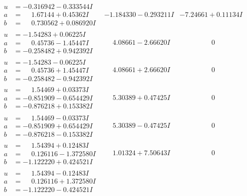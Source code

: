 \documentclass[1p]{elsarticle_modified}
\theoremstyle{definition}
\begin{document}
$$\begin{array}{c|c|c}
\begin{aligned}
u &= -0.316942 - 0.333544 I \\
a &= \phantom{-}1.67144 + 0.45362 I \\
b &= \phantom{-}0.730562 + 0.086920 I\end{aligned}
 & -1.184330 - 0.293211 I & -7.24661 + 0.11134 I \\ \hline\begin{aligned}
u &= -1.54283 + 0.06225 I \\
a &= \phantom{-}0.45736 - 1.45447 I \\
b &= -0.258482 + 0.942392 I\end{aligned}
 & \phantom{-}4.08661 - 2.66620 I & \phantom{-0.000000 } 0 \\ \hline\begin{aligned}
u &= -1.54283 - 0.06225 I \\
a &= \phantom{-}0.45736 + 1.45447 I \\
b &= -0.258482 - 0.942392 I\end{aligned}
 & \phantom{-}4.08661 + 2.66620 I & \phantom{-0.000000 } 0 \\ \hline\begin{aligned}
u &= \phantom{-}1.54469 + 0.03373 I \\
a &= -0.851909 - 0.654429 I \\
b &= -0.876218 + 0.153382 I\end{aligned}
 & \phantom{-}5.30389 + 0.47425 I & \phantom{-0.000000 } 0 \\ \hline\begin{aligned}
u &= \phantom{-}1.54469 - 0.03373 I \\
a &= -0.851909 + 0.654429 I \\
b &= -0.876218 - 0.153382 I\end{aligned}
 & \phantom{-}5.30389 - 0.47425 I & \phantom{-0.000000 } 0 \\ \hline\begin{aligned}
u &= \phantom{-}1.54394 + 0.12483 I \\
a &= \phantom{-}0.126116 - 1.372580 I \\
b &= -1.122220 + 0.424521 I\end{aligned}
 & \phantom{-}1.01324 + 7.50643 I & \phantom{-0.000000 } 0 \\ \hline\begin{aligned}
u &= \phantom{-}1.54394 - 0.12483 I \\
a &= \phantom{-}0.126116 + 1.372580 I \\
b &= -1.122220 - 0.424521 I\end{aligned}

\end{array}$$
\end{document}
